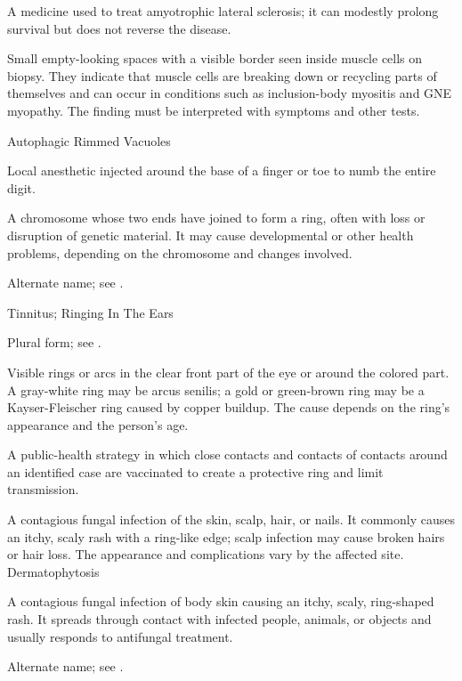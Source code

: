  A medicine used to treat amyotrophic lateral sclerosis; it can modestly prolong survival but does not reverse the disease.

 Small empty-looking spaces with a visible border seen inside muscle cells on biopsy. They indicate that muscle cells are breaking down or recycling parts of themselves and can occur in conditions such as inclusion-body myositis and GNE myopathy. The finding must be interpreted with symptoms and other tests.

\synonyms
Autophagic Rimmed Vacuoles

 Local anesthetic injected around the base of a finger or toe to numb the entire digit.

 A chromosome whose two ends have joined to form a ring, often with loss or disruption of genetic material. It may cause developmental or other health problems, depending on the chromosome and changes involved.

 Alternate name; see .

\synonyms
Tinnitus; Ringing In The Ears

 Plural form; see .

 Visible rings or arcs in the clear front part of the eye or around the colored part. A gray-white ring may be arcus senilis; a gold or green-brown ring may be a Kayser-Fleischer ring caused by copper buildup. The cause depends on the ring’s appearance and the person’s age.

 A public-health strategy in which close contacts and contacts of contacts around an identified case are vaccinated to create a protective ring and limit transmission.

 A contagious fungal infection of the skin, scalp, hair, or nails. It commonly causes an itchy, scaly rash with a ring-like edge; scalp infection may cause broken hairs or hair loss. The appearance and complications vary by the affected site.
\synonyms
Dermatophytosis

 A contagious fungal infection of body skin causing an itchy, scaly, ring-shaped rash. It spreads through contact with infected people, animals, or objects and usually responds to antifungal treatment.

 Alternate name; see .

